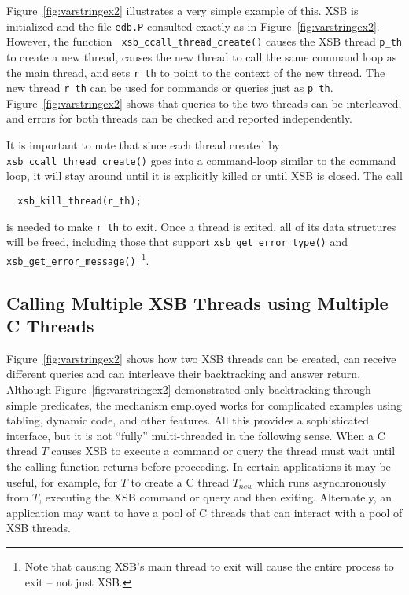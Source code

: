 Figure~\ref{fig:varstringex2} illustrates a very simple example of
this.  XSB is initialized and the file {\tt edb.P} consulted exactly as
in Figure~\ref{fig:varstringex2}.  However, the function {\tt
  xsb\_ccall\_thread\_create()} causes the XSB thread {\tt p\_th} to
create a new thread, causes the new thread to call the same command
loop as the main thread, and sets {\tt r\_th} to point to the context
of the new thread.  The new thread {\tt r\_th} can be used for
commands or queries just as {\tt p\_th}.
Figure~\ref{fig:varstringex2} shows that queries to the two threads
can be interleaved, and errors for both threads can be checked and
reported independently.
 
It is important to note that since each thread created by {\tt
  xsb\_ccall\_thread\_create()} goes into a command-loop similar to
the command loop, it will stay around until it is explicitly killed or
until XSB is closed.  The call 
\begin{verbatim}
  xsb_kill_thread(r_th);
\end{verbatim}
is needed to make {\tt r\_th} to exit.  Once a thread is exited, all
of its data structures will be freed, including those that support
{\tt xsb\_get\_error\_type()} and {\tt
  xsb\_get\_error\_message()}~\footnote{Note that causing XSB's main
  thread to exit will cause the entire process to exit -- not just
  XSB.}.

\subsection{Calling Multiple XSB Threads using Multiple C Threads} \label{sec:CXSBMTMT}

Figure~\ref{fig:varstringex2} shows how two XSB threads can be
created, can receive different queries and can interleave their
backtracking and answer return.  Although
Figure~\ref{fig:varstringex2} demonstrated only backtracking through
simple predicates, the mechanism employed works for complicated
examples using tabling, dynamic code, and other features.  All this
provides a sophisticated interface, but it is not ``fully''
multi-threaded in the following sense.  When a C thread $T$ causes XSB
to execute a command or query the thread must wait until the calling
function returns before proceeding.  In certain applications it may be
useful, for example, for $T$ to create a C thread $T_{new}$ which runs
asynchronously from $T$, executing the XSB command or query and then
exiting.  Alternately, an application may want to have a pool of C
threads that can interact with a pool of XSB threads.


